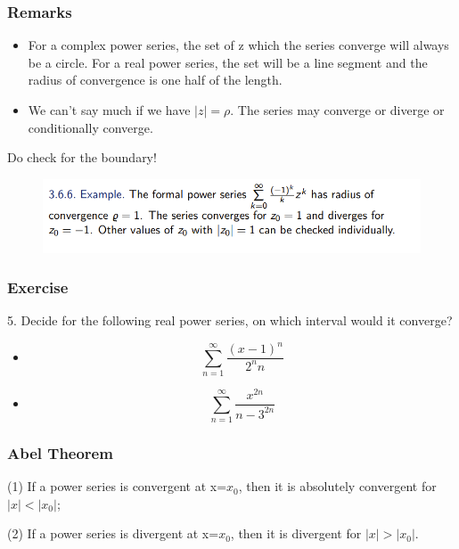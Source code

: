 \documentclass{beamer}
\begin{document}
\begin{frame}
    \frametitle{Remarks}
    \begin{itemize}
        \item For a complex power series, the set of z which the series converge
              will always be a circle. For a real power series, the set will be a line
              segment and the radius of convergence is one half of the length.
        \item We can’t say much if we have $|z| = \rho$. The series may converge or
              diverge or conditionally converge.
    \end{itemize}
    \vspace{1em}
    Do check for the boundary!
    \begin{figure}
        \centering
        \includegraphics[width=1\textwidth]{boundary.png}
    \end{figure}
\end{frame}
\begin{frame}
    \frametitle{Exercise}
    5. Decide for the following real power series, on which interval would it
    converge?
    \vspace{1em}
    \begin{itemize}
        \item $$\sum_{n=1}^\infty \frac{(x-1)^n}{2^n n}$$
        \item $$\sum_{n=1}^\infty \frac{x^{2n}}{n-3^{2n}}$$
    \end{itemize}
\end{frame}

\begin{frame}
    \frametitle{Abel Theorem}
    (1) If a power series is convergent at x=$x_0$, then it is absolutely convergent for $|x|<|x_0|$;

    (2) If a power series is divergent at x=$x_0$, then it is divergent for $|x|>|x_0|$.
\end{frame}
\end{document}
